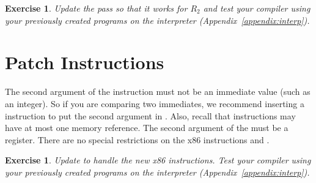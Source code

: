 \documentclass[11pt]{book}
\newtheorem{exercise}[theorem]{Exercise}
\begin{document}


\begin{exercise}\normalfont
Update the  pass so that it works for $R_2$
and test your compiler using your previously created programs on the
 interpreter (Appendix~\ref{appendix:interp}).
\end{exercise}


\section{Patch Instructions}

The second argument of the  instruction must not be an
immediate value (such as an integer). So if you are comparing two
immediates, we recommend inserting a  instruction to put the
second argument in . Also, recall that instructions may have
at most one memory reference.
%
The second argument of the  must be a register.
%
There are no special restrictions on the x86 instructions 
and .

\begin{exercise}\normalfont
Update  to handle the new x86 instructions.
Test your compiler using your previously created programs on the
 interpreter (Appendix~\ref{appendix:interp}).
\end{exercise}
\end{document}
